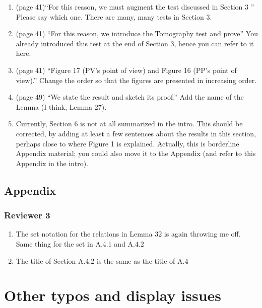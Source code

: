 \documentclass[12pt]{article}
\begin{document}
\begin{enumerate}
\item (page 41)``For this reason, we must
augment the test discussed in Section 3 '' Please say which one. There are many, many tests in Section 3.
\item (page 41) ``For this reason, we introduce the Tomography test and prove'' You already introduced this test at the end of Section 3, hence you can refer to it here.
\item (page 41) ``Figure 17 (PV’s point of view)
and Figure 16 (PP’s point of view).'' Change the order so that the figures are presented in increasing order.
\item (page 49) ``We state the result and sketch its proof.'' Add the name of the Lemma (I think, Lemma 27).
\item Currently, Section 6 is not at all summarized in the intro. This should be corrected, by adding at least a few sentences about the results in this section, perhaps close to where Figure 1 is explained. Actually, this is borderline Appendix material; you could also move it to the Appendix (and refer to this Appendix in the intro).
\end{enumerate}


\subsection*{Appendix}
\subsubsection*{Reviewer 3}
\begin{enumerate}
\item The set notation for the relations in Lemma 32 is again throwing me off. Same thing for the set in A.4.1 and A.4.2
\item The title of Section A.4.2 is the same as the title of A.4
\end{enumerate}



\section*{Other typos and display issues}
\end{document}
